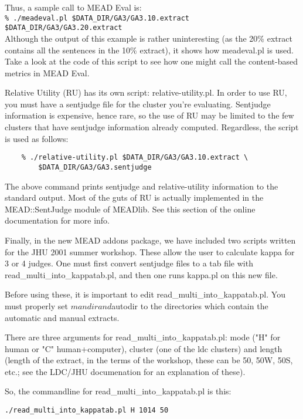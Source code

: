 \documentclass[10pt]{article}
\begin{document}
Thus, a sample call to MEAD Eval is:\\

    \verb|% ./meadeval.pl $DATA_DIR/GA3/GA3.10.extract $DATA_DIR/GA3/GA3.20.extract|\\

Although the output of this example is rather uninteresting
(as the 20\% extract contains all the sentences in the 10\%
extract), it shows how meadeval.pl is used.  Take a look at the
code of this script to see how one might call the content-based
metrics in MEAD Eval.

Relative Utility (RU) has its own script: relative-utility.pl.  In
order to use RU, you must have a sentjudge file for the cluster 
you're evaluating.  Sentjudge information is expensive, hence
rare, so the use of RU may be limited to the few clusters that
have sentjudge information already computed.  Regardless, the
script is used as follows:

\begin{verbatim}
    % ./relative-utility.pl $DATA_DIR/GA3/GA3.10.extract \
        $DATA_DIR/GA3/GA3.sentjudge
\end{verbatim}

The above command prints sentjudge and relative-utility
information to the standard output.  Most of the guts of
RU is actually implemented in the MEAD::SentJudge module
of MEADlib.  See this section of the online documentation
for more info.

Finally, in the new MEAD addons package, we have included two 
scripts written for the JHU 2001 summer workshop.  These allow
the user to calculate kappa for 3 or 4 judges.  One must first convert 
sentjudge files to a tab file with read\_multi\_into\_kappatab.pl, and then one runs 
kappa.pl on this new file.

Before using these, it is important to edit read\_multi\_into\_kappatab.pl.  You must
properly set $mandir and $autodir to the directories which contain the
automatic and manual extracts.  

There are three arguments for read\_multi\_into\_kappatab.pl: mode ("H" for human or "C" 
human+computer), cluster (one of the ldc clusters) and length (length of the extract, 
in the terms of the workshop, these can be 50, 50W, 50S, etc.; see the LDC/JHU 
documenation for an explanation of these).

So, the commandline for read\_multi\_into\_kappatab.pl is this:
\begin{verbatim}
./read_multi_into_kappatab.pl H 1014 50
\end{verbatim}
\end{document}
